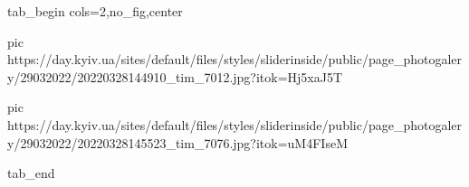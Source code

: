  
 
 
 
 

\ifcmt
  tab_begin cols=2,no_fig,center

     pic https://day.kyiv.ua/sites/default/files/styles/sliderinside/public/page_photogalery/29032022/20220328144910_tim_7012.jpg?itok=Hj5xaJ5T

		 pic https://day.kyiv.ua/sites/default/files/styles/sliderinside/public/page_photogalery/29032022/20220328145523_tim_7076.jpg?itok=uM4FIseM

  tab_end
\fi
